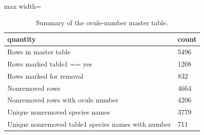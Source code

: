 \begin{table}
\caption{Summary of the ovule-number master table.}
\label{tab:master_summary}
\begin{adjustbox}{max width=\textwidth}
\begin{tabular}{ll}
\toprule
quantity & count \\
\midrule
Rows in master table & 5496 \\
Rows marked table1 == yes & 1208 \\
Rows marked for removal & 832 \\
Nonremoved rows & 4664 \\
Nonremoved rows with ovule number & 4206 \\
Unique nonremoved species names & 3779 \\
Unique nonremoved table1 species names with number & 711 \\
\bottomrule
\end{tabular}
\end{adjustbox}
\end{table}
